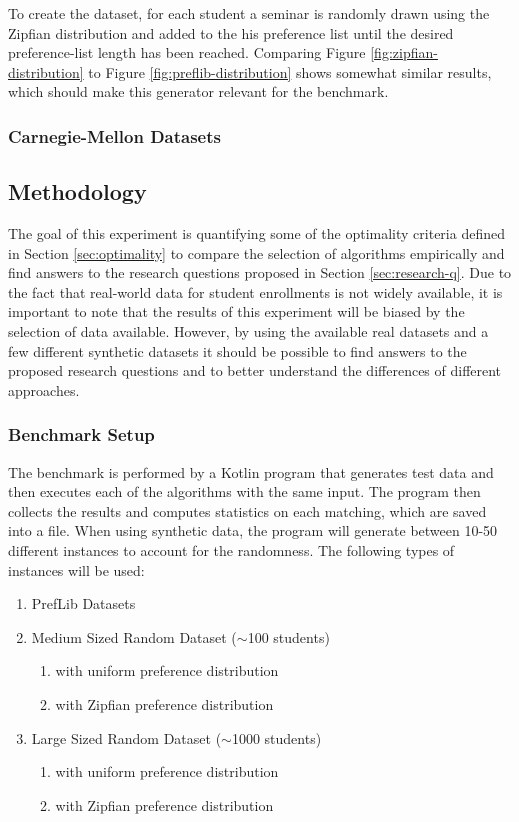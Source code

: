 To create the dataset, for each student a seminar is randomly drawn using the Zipfian distribution and added to the his preference list until the desired preference-list length has been reached. Comparing Figure \ref{fig:zipfian-distribution} to Figure \ref{fig:preflib-distribution} shows somewhat similar results, which should make this generator relevant for the benchmark. 

\subsubsection{Carnegie-Mellon Datasets}

\subsection{Methodology}
The goal of this experiment is quantifying some of the optimality criteria defined in Section \ref{sec:optimality} to compare the selection of algorithms empirically and find answers to the research questions proposed in Section \ref{sec:research-q}. Due to the fact that real-world data for student enrollments is not widely available, it is important to note that the results of this experiment will be biased by the selection of data available. However, by using the available real datasets and a few different synthetic datasets it should be possible to find answers to the proposed research questions and to better understand the differences of different approaches.

\subsubsection{Benchmark Setup}
The benchmark is performed by a Kotlin program that generates test data and then executes each of the algorithms with the same input. The program then collects the results and computes statistics on each matching, which are saved into a file. When using synthetic data, the program will generate between 10-50 different instances to account for the randomness. The following types of instances will be used:
\begin{enumerate}
  \item PrefLib Datasets
  \item Medium Sized Random Dataset ($\sim$100 students)
  \begin{enumerate}
    \item with uniform preference distribution
    \item with Zipfian preference distribution
  \end{enumerate}
  \item Large Sized Random Dataset ($\sim$1000 students)
  \begin{enumerate}
    \item with uniform preference distribution
    \item with Zipfian preference distribution
  \end{enumerate}
\end{enumerate}

